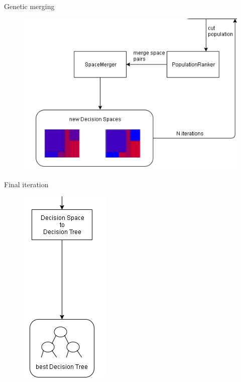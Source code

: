\documentclass[english]{beamer}
\begin{document}
{
\begin{frame}{Genetic merging}
	\begin{figure}
		\centering
		\includegraphics[scale=0.7]{figures/genetic_merging.png}
	\end{figure}
\end{frame} }

{
\begin{frame}{Final iteration}
	\vspace{-1em}
	\begin{figure}
		\centering
		\includegraphics[scale=0.7]{figures/final_iteration.png}
	\end{figure}
\end{frame} }
\end{document}
